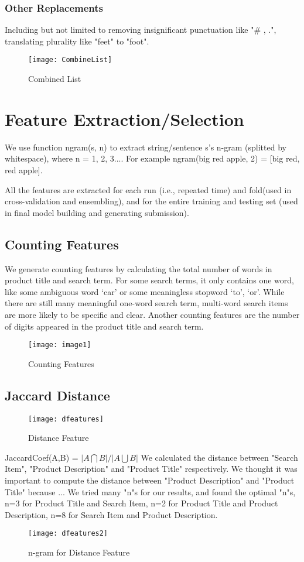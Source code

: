 \documentclass[journal]{IEEEtran}
\begin{document}
\subsubsection{Other Replacements}
Including but not limited to removing insignificant punctuation like "\# , .", translating plurality like "feet" to "foot".
\begin{figure}[htbp] 
\centering\texttt{[image: CombineList]} 
\caption{Combined List}\label{fig:3} 
\end{figure} 
\section{Feature Extraction/Selection}
We use function ngram(s, n) to extract string/sentence s’s n-gram (splitted by whitespace), where n = 1, 2, 3.... For example ngram(big red apple, 2) = [big red, red apple].

All the features are extracted for each run (i.e., repeated time) and fold(used in cross-validation and ensembling), and for the entire training and testing set (used in final model building and generating submission).
\subsection{Counting Features}
We generate counting features by calculating the total number of words in product title and search term. For some search terms, it only contains one word, like some ambiguous word ‘car’ or some meaningless stopword ‘to’, ‘or’. While there are still many meaningful one-word search term, multi-word search items are more likely to be specific and clear. Another counting features are the number of digits appeared in the product title and search term.
\begin{figure}[htbp] 
\centering\texttt{[image: image1]} 
\caption{Counting Features}\label{fig:4} 
\end{figure} 
\subsection{Jaccard Distance}
\begin{figure}[htbp] 
\centering\texttt{[image: dfeatures]} 
\caption{Distance Feature}\label{fig:5} 
\end{figure} 
JaccardCoef(A,B) = $|A\bigcap B|/|A\bigcup B|$
We calculated the distance between "Search Item", "Product Description" and "Product Title" respectively. We thought it was important to compute the distance between "Product Description" and "Product Title" because ...
We tried many "n"s for our results, and found the optimal "n"s, n=3 for Product Title and Search Item, n=2 for Product Title and Product Description, n=8 for Search Item and Product Description.
\begin{figure}[htbp] 
\centering\texttt{[image: dfeatures2]} 
\caption{n-gram for Distance Feature}\label{fig:6} 
\end{figure} 
\end{document}
